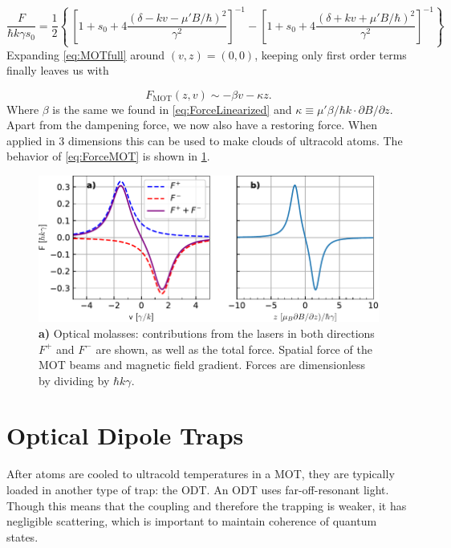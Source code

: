 \begin{equation}\label{eq:MOTfull}
	\frac{F}{\hbar k \gamma s_0} = \frac{1}{2}\left\{\
	\left[1 + s_0 + 4\frac{(\delta - k v - \mu'B / \hbar)^2}{\gamma^2}\right]^{-1}-
	\left[1 + s_0 + 4\frac{(\delta + k v + \mu'B / \hbar)^2}{\gamma^2}\right]^{-1}
	\right\}     
\end{equation}                          
Expanding \cref{eq:MOTfull} around $(v,z) = (0,0)$, keeping only first order terms finally leaves us with \cite{Kowalski2010}

\begin{equation}\label{eq:ForceMOT}
	F_{\text{MOT}}(z,v) \sim -\beta v - \kappa z.
\end{equation}
Where $\beta$ is the same we found in \cref{eq:ForceLinearized} and $\kappa \equiv \mu' \beta /\hbar k \cdot \partial B/\partial z$. 
Apart from the dampening force, we now also have a restoring force. 
When applied in 3 dimensions this can be used to make clouds of ultracold atoms. The behavior of \cref{eq:ForceMOT} is shown in \cref{fig:SpatialDependencePlots}.

\begin{figure}
    \centering
    \includegraphics[width=0.8\linewidth]{figures/SpatialVelocityDependence.pdf}
    \caption{\textbf{a)} Optical molasses: contributions from the lasers in both directions $\mathsf{\textit{F}^+}$ and $\mathsf{\textit{F}^-}$ are shown, as well as the total force. Spatial force of the MOT beams and magnetic field gradient. Forces are dimensionless by dividing by $\mathsf{\hbar \textit{k} \gamma}$.}
    \label{fig:SpatialDependencePlots}
\end{figure}

\section{Optical Dipole Traps}\label{sec:ODT}

After atoms are cooled to ultracold temperatures in a \ac{MOT}, they are typically loaded in another type of trap: the \ac{ODT}. 
An ODT uses far-off-resonant light. Though this means that the coupling and therefore the trapping is weaker, it has negligible scattering, which is important to maintain coherence of quantum states. 


